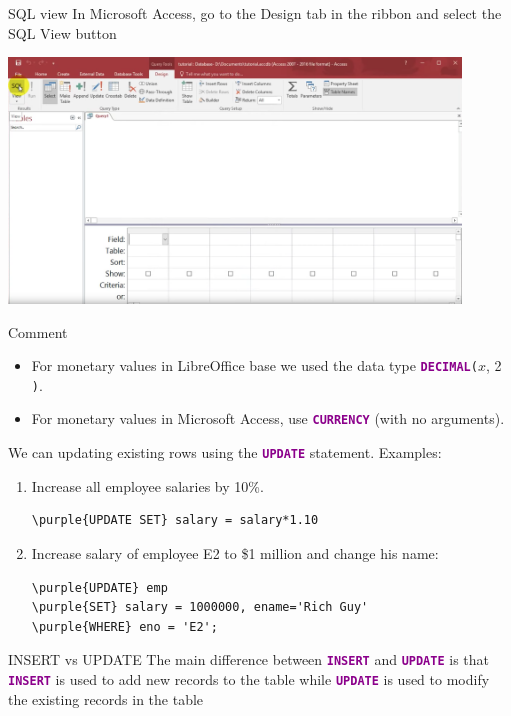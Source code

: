 \documentclass[xcolor=svgnames]{beamer}
\newcommand{\purple}[1]{{\textcolor{DarkMagenta}{#1}}}
\newcommand{\command}[1]{\texttt{\textbf{\textcolor{DarkMagenta}{#1}}}}
\theoremstyle{example}
\begin{document}
\begin{frame}{SQL view}\label{SQLaccess}
In Microsoft Access, go to the Design tab in the ribbon and select the SQL View button
\begin{center}
\includegraphics[width=0.9\textwidth]{img/SQLview}
\end{center}
\end{frame}


\begin{frame}{Comment}
\begin{itemize}
\item For monetary values in LibreOffice base we used the data type \command{DECIMAL}{\tt (}$x$, 2 {\tt )}.
\item For monetary values in Microsoft Access, use \command{CURRENCY} (with no arguments).
\end{itemize}
\end{frame}





\begin{frame}[fragile]
We can updating existing rows using the \command{UPDATE} statement.  Examples:
\begin{enumerate}
\item Increase all employee salaries by 10\%.
\begin{Verbatim}[frame=single, xleftmargin=1cm, xrightmargin=1cm, commandchars=\\\{\}]
\purple{UPDATE SET} salary = salary*1.10
\end{Verbatim}
\item Increase salary of employee E2 to \$1 million and change his name:
\begin{Verbatim}[frame=single, xleftmargin=1cm, xrightmargin=1cm, commandchars=\\\{\}]
\purple{UPDATE} emp 
\purple{SET} salary = 1000000, ename='Rich Guy'
\purple{WHERE} eno = 'E2';
\end{Verbatim}
\end{enumerate}

\vspace{1em}
\begin{alertblock}{INSERT vs UPDATE}
The main difference between \command{INSERT} and \command{UPDATE} is that \command{INSERT} is used to add new records to the table while \command{UPDATE} is used to modify the existing records in the table
\end{alertblock}
\end{frame}
\end{document}
